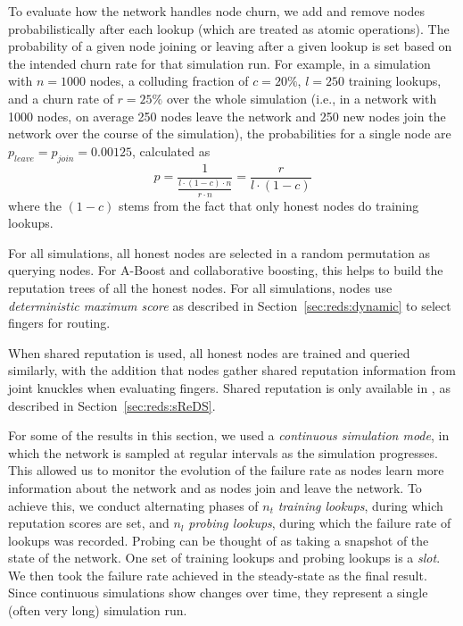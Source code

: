  To evaluate how the network handles node churn, we
add and remove nodes probabilistically after each lookup (which are
treated as atomic operations). The probability of a given node joining
or leaving after a given lookup is set based on the intended churn rate
for that simulation run. For example, in a simulation with $n = 1000$
nodes, a colluding fraction of $c = 20\%$, $l=250$ training lookups, and
a churn rate of $r = 25\%$ over the whole simulation (i.e., in a network
with 1000 nodes, on average 250 nodes leave the network and 250 new
nodes join the network over the course of the simulation),  the
probabilities for a single node are $p_{leave} = p_{join} = 0.00125$,
calculated as
\begin{equation*}
p = \frac{1}{\frac{l \cdot (1 - c) \cdot n}{r \cdot n}} = 
\frac{r}{l \cdot (1-c)}
\end{equation*}
where the $(1-c)$ stems from the fact that only honest nodes do training
lookups.



 For all simulations, all honest
nodes are selected in a random permutation as querying nodes. For A-Boost
and collaborative boosting, this helps to build the reputation trees of
all the honest nodes. For all \sys simulations, nodes use
\emph{deterministic maximum score} as described in
Section~\ref{sec:reds:dynamic} to select fingers for routing.

 When shared reputation is used, all
honest nodes are trained and queried similarly, with the addition that
nodes gather shared reputation information from joint knuckles when
evaluating fingers. Shared reputation is only available in \hsys, as
described in Section~\ref{sec:reds:sReDS}.


  For some of the results in this section, we used
a {\em continuous simulation mode}, in which the network is sampled at
regular intervals as the simulation progresses. This allowed us to
monitor the evolution of the failure rate as nodes learn more
information about the network and as nodes join and leave the
network. To achieve this, we conduct alternating phases of $n_t$ {\em
  training lookups}, during which reputation scores are set, and $n_l$
{\em probing lookups}, during which the failure rate of lookups was
recorded. Probing can be thought of as taking a snapshot of the state of
the network. One set of training lookups and probing lookups is a
\emph{slot}.
We then took the failure rate achieved in the steady-state as the final
result. Since continuous simulations show changes over time, they
represent a single (often very long) simulation run.

